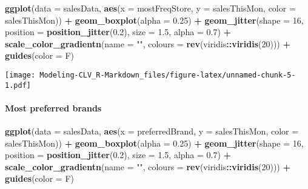 \documentclass[
]{article}
\newenvironment{Shaded}{\begin{snugshade}}{\end{snugshade}}
\newcommand{\DataTypeTok}[1]{\textcolor[rgb]{0.13,0.29,0.53}{#1}}
\newcommand{\DecValTok}[1]{\textcolor[rgb]{0.00,0.00,0.81}{#1}}
\newcommand{\FloatTok}[1]{\textcolor[rgb]{0.00,0.00,0.81}{#1}}
\newcommand{\KeywordTok}[1]{\textcolor[rgb]{0.13,0.29,0.53}{\textbf{#1}}}
\newcommand{\NormalTok}[1]{#1}
\newcommand{\OperatorTok}[1]{\textcolor[rgb]{0.81,0.36,0.00}{\textbf{#1}}}
\newcommand{\StringTok}[1]{\textcolor[rgb]{0.31,0.60,0.02}{#1}}
\begin{document}
\begin{Shaded}
\begin{Highlighting}[]
\KeywordTok{ggplot}\NormalTok{(}\DataTypeTok{data =}\NormalTok{ salesData, }\KeywordTok{aes}\NormalTok{(}\DataTypeTok{x =}\NormalTok{ mostFreqStore, }\DataTypeTok{y =}\NormalTok{ salesThisMon, }\DataTypeTok{color =}\NormalTok{ salesThisMon)) }\OperatorTok{+}
\StringTok{  }\KeywordTok{geom_boxplot}\NormalTok{(}\DataTypeTok{alpha =} \FloatTok{0.25}\NormalTok{) }\OperatorTok{+}
\StringTok{  }\KeywordTok{geom_jitter}\NormalTok{(}\DataTypeTok{shape =} \DecValTok{16}\NormalTok{, }\DataTypeTok{position =} \KeywordTok{position_jitter}\NormalTok{(}\FloatTok{0.2}\NormalTok{), }\DataTypeTok{size =} \FloatTok{1.5}\NormalTok{, }\DataTypeTok{alpha =} \FloatTok{0.7}\NormalTok{) }\OperatorTok{+}
\StringTok{  }\KeywordTok{scale_color_gradientn}\NormalTok{(}\DataTypeTok{name =} \StringTok{""}\NormalTok{, }\DataTypeTok{colours =} \KeywordTok{rev}\NormalTok{(viridis}\OperatorTok{::}\KeywordTok{viridis}\NormalTok{(}\DecValTok{20}\NormalTok{))) }\OperatorTok{+}
\StringTok{  }\KeywordTok{guides}\NormalTok{(}\DataTypeTok{color =}\NormalTok{ F)}
\end{Highlighting}
\end{Shaded}

\texttt{[image: Modeling-CLV\_R-Markdown\_files/figure-latex/unnamed-chunk-5-1.pdf]}

\hypertarget{most-preferred-brands}{%
\paragraph{Most preferred brands}\label{most-preferred-brands}}

\begin{Shaded}
\begin{Highlighting}[]
\KeywordTok{ggplot}\NormalTok{(}\DataTypeTok{data =}\NormalTok{ salesData, }\KeywordTok{aes}\NormalTok{(}\DataTypeTok{x =}\NormalTok{ preferredBrand, }\DataTypeTok{y =}\NormalTok{ salesThisMon, }\DataTypeTok{color =}\NormalTok{ salesThisMon)) }\OperatorTok{+}
\StringTok{  }\KeywordTok{geom_boxplot}\NormalTok{(}\DataTypeTok{alpha =} \FloatTok{0.25}\NormalTok{) }\OperatorTok{+}
\StringTok{  }\KeywordTok{geom_jitter}\NormalTok{(}\DataTypeTok{shape =} \DecValTok{16}\NormalTok{, }\DataTypeTok{position =} \KeywordTok{position_jitter}\NormalTok{(}\FloatTok{0.2}\NormalTok{), }\DataTypeTok{size =} \FloatTok{1.5}\NormalTok{, }\DataTypeTok{alpha =} \FloatTok{0.7}\NormalTok{) }\OperatorTok{+}
\StringTok{  }\KeywordTok{scale_color_gradientn}\NormalTok{(}\DataTypeTok{name =} \StringTok{""}\NormalTok{, }\DataTypeTok{colours =} \KeywordTok{rev}\NormalTok{(viridis}\OperatorTok{::}\KeywordTok{viridis}\NormalTok{(}\DecValTok{20}\NormalTok{))) }\OperatorTok{+}
\StringTok{  }\KeywordTok{guides}\NormalTok{(}\DataTypeTok{color =}\NormalTok{ F) }
\end{Highlighting}
\end{Shaded}
\end{document}
